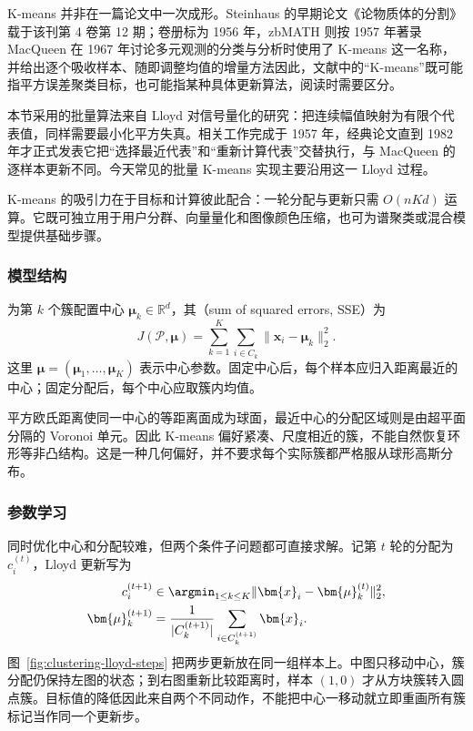 K-means 并非在一篇论文中一次成形。Steinhaus 的早期论文《论物质体的分割》载于该刊第 4 卷第 12 期；卷册标为 1956 年，zbMATH 则按 1957 年著录MacQueen 在 1967 年讨论多元观测的分类与分析时使用了 K-means 这一名称，并给出逐个吸收样本、随即调整均值的增量方法因此，文献中的“K-means”既可能指平方误差聚类目标，也可能指某种具体更新算法，阅读时需要区分。

本节采用的批量算法来自 Lloyd 对信号量化的研究：把连续幅值映射为有限个代表值，同样需要最小化平方失真。相关工作完成于 1957 年，经典论文直到 1982 年才正式发表它把“选择最近代表”和“重新计算代表”交替执行，与 MacQueen 的逐样本更新不同。今天常见的批量 K-means 实现主要沿用这一 Lloyd 过程。

K-means 的吸引力在于目标和计算彼此配合：一轮分配与更新只需 $O(nKd)$ 运算。它既可独立用于用户分群、向量量化和图像颜色压缩，也可为谱聚类或混合模型提供基础步骤。

\subsubsection{模型结构}

为第 $k$ 个簇配置中心 $\bm{\mu}_k\in\mathbb{R}^d$，其（sum of squared errors, SSE）为
\begin{equation}
  J(\mathcal{P},\bm{\mu})
  =\sum_{k=1}^K\sum_{i\in C_k}
    \lVert\bm{x}_i-\bm{\mu}_k\rVert_2^2.
  \label{eq:clustering-sse}
\end{equation}
这里 $\bm{\mu}=(\bm{\mu}_1,\ldots,\bm{\mu}_K)$ 表示中心参数。固定中心后，每个样本应归入距离最近的中心；固定分配后，每个中心应取簇内均值。

平方欧氏距离使同一中心的等距离面成为球面，最近中心的分配区域则是由超平面分隔的 Voronoi 单元。因此 K-means 偏好紧凑、尺度相近的簇，不能自然恢复环形等非凸结构。这是一种几何偏好，并不要求每个实际簇都严格服从球形高斯分布。

\subsubsection{参数学习}

同时优化中心和分配较难，但两个条件子问题都可直接求解。记第 $t$ 轮的分配为 $c_i^{(t)}$，Lloyd 更新写为
\begin{align}
  c_i^{(t+1)}
    &\in\argmin_{1\leq k\leq K}
      \lVert\bm{x}_i-\bm{\mu}_k^{(t)}\rVert_2^2,
      \label{eq:clustering-lloyd-assignment}\\
  \bm{\mu}_k^{(t+1)}
    &=\frac{1}{|C_k^{(t+1)}|}
      \sum_{i\in C_k^{(t+1)}}\bm{x}_i.
      \label{eq:clustering-lloyd-centre}
\end{align}
图~\ref{fig:clustering-lloyd-steps} 把两步更新放在同一组样本上。中图只移动中心，簇分配仍保持左图的状态；到右图重新比较距离时，样本 $(1,0)$ 才从方块簇转入圆点簇。目标值的降低因此来自两个不同动作，不能把中心一移动就立即重画所有簇标记当作同一个更新步。

